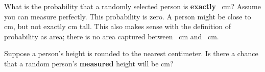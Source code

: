 \begin{examplewrap}
\begin{nexample}{What is the probability that a randomly selected person is \textbf{exactly} ~cm? Assume you can measure perfectly.}
\label{probabilityOfExactly180cm}
This probability is zero. A person might be close to  cm, but not exactly  cm tall. This also makes sense with the definition of probability as area; there is no area captured between ~cm and ~cm.
\end{nexample}
\end{examplewrap}

\begin{exercisewrap}
\begin{nexercise}
Suppose a person's height is rounded to the nearest centimeter. Is there a chance that a random person's \textbf{measured} height will be  cm?\footnotemark
\end{nexercise}
\end{exercisewrap}




